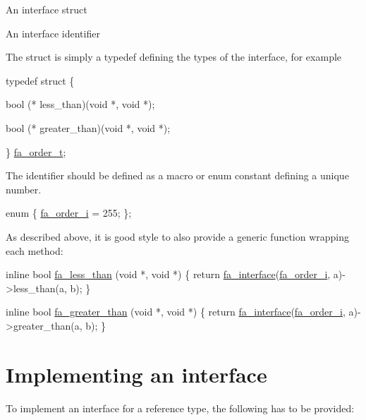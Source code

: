 \begin{DoxyItemize}
\item An interface struct
\item An interface identifier
\end{DoxyItemize}

The struct is simply a typedef defining the types of the interface, for example


\begin{DoxyCode}
\textcolor{keyword}{typedef} \textcolor{keyword}{struct }\{

    bool (* less\_than)(\textcolor{keywordtype}{void} *, \textcolor{keywordtype}{void} *);

    bool (* greater\_than)(\textcolor{keywordtype}{void} *, \textcolor{keywordtype}{void} *);

\} \hyperlink{structfa__order__t}{fa\_order\_t};
\end{DoxyCode}


The identifier should be defined as a macro or enum constant defining a unique number.


\begin{DoxyCode}
\textcolor{keyword}{enum} \{ \hyperlink{interfaces_8h_a7c337b4de759549a84c656770ce01cd2ae08a92558a44d2796dc2a5df8ff1b3c3}{fa\_order\_i} = 255; \};
\end{DoxyCode}


As described above, it is good style to also provide a generic function wrapping each method\-:


\begin{DoxyCode}
\textcolor{keyword}{inline} \textcolor{keywordtype}{bool} \hyperlink{group___fa_ga4747e94dca95afaf031d6b00c36cc8fc}{fa\_less\_than} (\textcolor{keywordtype}{void} *, \textcolor{keywordtype}{void} *)
\{
    \textcolor{keywordflow}{return} \hyperlink{group___fa_ga1cc4276643f3d366681ac7ff71fa8b06}{fa\_interface}(\hyperlink{interfaces_8h_a7c337b4de759549a84c656770ce01cd2ae08a92558a44d2796dc2a5df8ff1b3c3}{fa\_order\_i}, a)->less\_than(a, b);
\}

\textcolor{keyword}{inline} \textcolor{keywordtype}{bool} \hyperlink{group___fa_ga64d9591f70db8eb11f530b056ac90285}{fa\_greater\_than} (\textcolor{keywordtype}{void} *, \textcolor{keywordtype}{void} *)
\{
    \textcolor{keywordflow}{return} \hyperlink{group___fa_ga1cc4276643f3d366681ac7ff71fa8b06}{fa\_interface}(\hyperlink{interfaces_8h_a7c337b4de759549a84c656770ce01cd2ae08a92558a44d2796dc2a5df8ff1b3c3}{fa\_order\_i}, a)->greater\_than(a, b);
\}
\end{DoxyCode}
\hypertarget{md__interfaces_Implementing}{}\section{Implementing an interface}\label{md__interfaces_Implementing}
To implement an interface for a reference type, the following has to be provided\-:


